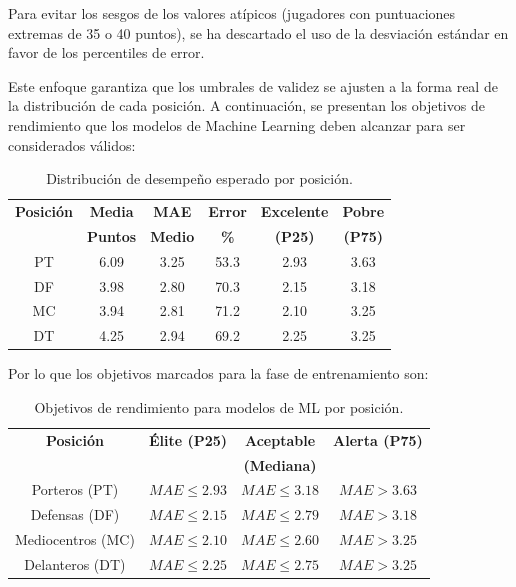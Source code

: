 Para evitar los sesgos de los valores atípicos (jugadores con puntuaciones
extremas de 35 o 40 puntos), se ha descartado el uso de la desviación estándar
en favor de los percentiles de error.
 
Este enfoque garantiza que los umbrales de
validez se ajusten a la forma real de la distribución de cada posición.
A continuación, se presentan los objetivos de rendimiento que los modelos de
Machine Learning deben alcanzar para ser considerados válidos:
 
\begin{table}[H]
\centering
\renewcommand{\arraystretch}{1.3}
\begin{tabular}{|c|c|c|c|c|c|}
\hline
\textbf{Posición} & \textbf{Media} & \textbf{MAE} & \textbf{Error} &
\textbf{Excelente} & \textbf{Pobre} \\
& \textbf{Puntos} & \textbf{Medio} & \textbf{\%} & \textbf{(P25)} &
\textbf{(P75)} \\
\hline
PT & 6.09 & 3.25 & 53.3 & 2.93 & 3.63 \\
\hline
DF & 3.98 & 2.80 & 70.3 & 2.15 & 3.18 \\
\hline
MC & 3.94 & 2.81 & 71.2 & 2.10 & 3.25 \\
\hline
DT & 4.25 & 2.94 & 69.2 & 2.25 & 3.25 \\
\hline
\end{tabular}
\caption{Distribución de desempeño esperado por posición.}
\label{tab:benchmarking}
\end{table}
 
Por lo que los objetivos marcados para la fase de entrenamiento son:
 
\begin{table}[H]
\centering
\renewcommand{\arraystretch}{1.4}
\begin{tabular}{|c|c|c|c|}
\hline
\textbf{Posición} & \textbf{Élite (P25)} & \textbf{Aceptable} &
\textbf{Alerta (P75)} \\
& & \textbf{(Mediana)} & \\
\hline
Porteros (PT) & $MAE \le 2.93$ & $MAE \le 3.18$ & $MAE > 3.63$ \\
\hline
Defensas (DF) & $MAE \le 2.15$ & $MAE \le 2.79$ & $MAE > 3.18$ \\
\hline
Mediocentros (MC) & $MAE \le 2.10$ & $MAE \le 2.60$ & $MAE > 3.25$ \\
\hline
Delanteros (DT) & $MAE \le 2.25$ & $MAE \le 2.75$ & $MAE > 3.25$ \\
\hline
\end{tabular}
\caption{Objetivos de rendimiento para modelos de ML por posición.}
\label{tab:objetivos-ml}
\end{table}
 
